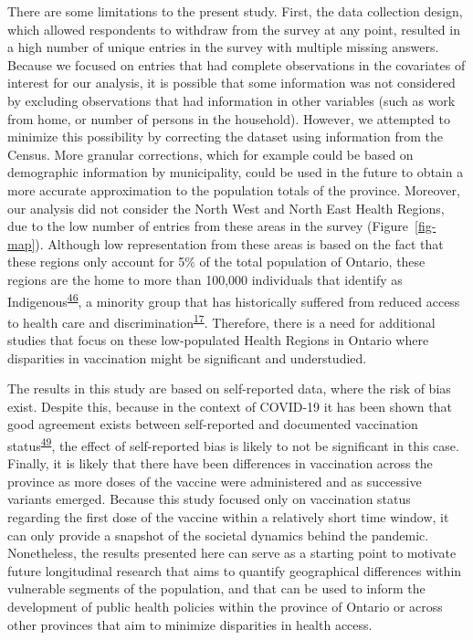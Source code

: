 \documentclass[
  letterpaper,
  DIV=11,
  numbers=noendperiod]{scrartcl}
\begin{document}
There are some limitations to the present study. First, the data
collection design, which allowed respondents to withdraw from the survey
at any point, resulted in a high number of unique entries in the survey
with multiple missing answers. Because we focused on entries that had
complete observations in the covariates of interest for our analysis, it
is possible that some information was not considered by excluding
observations that had information in other variables (such as work from
home, or number of persons in the household). However, we attempted to
minimize this possibility by correcting the dataset using information
from the Census. More granular corrections, which for example could be
based on demographic information by municipality, could be used in the
future to obtain a more accurate approximation to the population totals
of the province. Moreover, our analysis did not consider the North West
and North East Health Regions, due to the low number of entries from
these areas in the survey (Figure~\ref{fig-map}). Although low
representation from these areas is based on the fact that these regions
only account for 5\% of the total population of Ontario, these regions
are the home to more than 100,000 individuals that identify as
Indigenous\textsuperscript{\protect\hyperlink{ref-ontariohealth}{46}}, a
minority group that has historically suffered from reduced access to
health care and
discrimination\textsuperscript{\protect\hyperlink{ref-mosby2021}{17}}.
Therefore, there is a need for additional studies that focus on these
low-populated Health Regions in Ontario where disparities in vaccination
might be significant and understudied.

The results in this study are based on self-reported data, where the
risk of bias exist. Despite this, because in the context of COVID-19 it
has been shown that good agreement exists between self-reported and
documented vaccination
status\textsuperscript{\protect\hyperlink{ref-stephenson2022}{49}}, the
effect of self-reported bias is likely to not be significant in this
case. Finally, it is likely that there have been differences in
vaccination across the province as more doses of the vaccine were
administered and as successive variants emerged. Because this study
focused only on vaccination status regarding the first dose of the
vaccine within a relatively short time window, it can only provide a
snapshot of the societal dynamics behind the pandemic. Nonetheless, the
results presented here can serve as a starting point to motivate future
longitudinal research that aims to quantify geographical differences
within vulnerable segments of the population, and that can be used to
inform the development of public health policies within the province of
Ontario or across other provinces that aim to minimize disparities in
health access.
\end{document}
